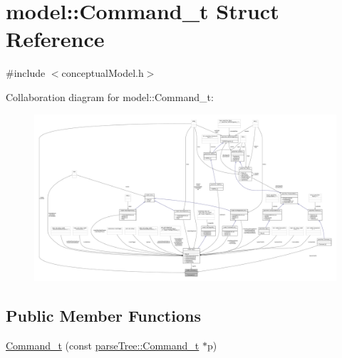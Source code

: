 \hypertarget{structmodel_1_1_command__t}{}\section{model\+:\+:Command\+\_\+t Struct Reference}
\label{structmodel_1_1_command__t}


{\ttfamily \#include $<$conceptual\+Model.\+h$>$}



Collaboration diagram for model\+:\+:Command\+\_\+t\+:
\nopagebreak
\begin{figure}[H]
\begin{center}
\leavevmode
\includegraphics[width=350pt]{structmodel_1_1_command__t__coll__graph}
\end{center}
\end{figure}
\subsection*{Public Member Functions}
\begin{DoxyCompactItemize}
\item 
\hyperlink{structmodel_1_1_command__t_a1f8c8d00a7fe433d6a4a5c626b0604d8}{Command\+\_\+t} (const \hyperlink{structparse_tree_1_1_command__t}{parse\+Tree\+::\+Command\+\_\+t} $\ast$p)
\end{DoxyCompactItemize}

